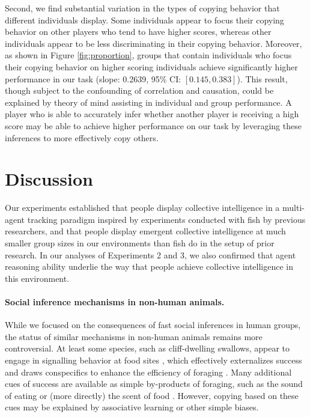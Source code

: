 \documentclass[12pt,letterpaper]{article}
\begin{document}
Second, we find substantial variation in the types of copying behavior
that different individuals display.  Some individuals appear to focus
their copying behavior on other players who tend to have higher
scores, whereas other individuals appear to be less discriminating in
their copying behavior.  Moreover, as shown in Figure
\ref{fig:proportion}, groups that contain individuals who focus their
copying behavior on higher scoring individuals achieve significantly
higher performance in our task (slope: 0.2639, 95\% CI: $[0.145,
  0.383]$).  This result, though subject to the confounding of
correlation and causation, could be explained by theory of mind
assisting in individual and group performance.  A player who is able
to accurately infer whether another player is receiving a high score
may be able to achieve higher performance on our task by leveraging
these inferences to more effectively copy others.


\section{Discussion}

Our experiments established that people display collective intelligence in a multi-agent tracking paradigm inspired by experiments conducted with fish by previous researchers, and that people display emergent collective intelligence at much smaller group sizes in our environments than fish do in the setup of prior research.  In our analyses of Experiments 2 and 3, we also confirmed that agent reasoning ability underlie the way that people achieve collective intelligence in this environment.

\paragraph{Social inference mechanisms in non-human animals.}

While we focused on the consequences of fast social inferences in human groups, the status of similar mechanisms in non-human animals remains more controversial.
At least some species, such as cliff-dwelling swallows, appear to engage in signalling behavior at food sites \cite{brown1988social,brown1991food}, which effectively externalizes success and draws conspecifics to enhance the efficiency of foraging \cite{torney2011signalling}.
Many additional cues of success are available as simple by-products of foraging, such as the sound of eating or (more directly) the scent of food \cite{galef2001social}.
However, copying based on these cues may be explained by associative learning or other simple biases.
\end{document}
